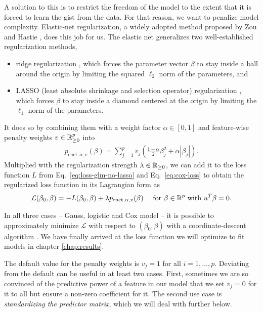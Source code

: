 A solution to this is to restrict the freedom of the model to the extent that it is forced to 
learn the gist from the data. For that reason, we want to penalize model complexity. Elastic-net 
regularization, a widely adopted method proposed by Zou and Hastie \cite{elasticnet05}, does this 
job for us. The elastic net generalizes two well-established regularization methods,
\begin{itemize}
    \item ridge regularization \cite{ridge70}, which forces the parameter vector $\beta$ to 
        stay inside a ball around the origin by limiting the squared $\ell_2$ norm 
        of the parameters, and 
    \item LASSO (least absolute shrinkage and selection operator) regularization \cite{lasso18}, 
        which forces $\beta$ to stay inside a diamond centered at the origin by limiting the 
        $\ell_1$ norm of the parameters.
\end{itemize}
It does so by combining them with a weight factor $\alpha \in [0, 1]$ and feature-wise penalty 
weights $v \in \mathbb{R}_{\geq 0}^p$ into
\begin{align}\label{eq:enet-weights}
    p_{\text{enet}, \alpha, v}(\beta) = \sum_{j=1}^p v_j \left( \frac{1-\alpha}{2} \beta_j^2 +
    \alpha |\beta_j| \right).
\end{align}
Multiplied with the regularization strength $\lambda \in \mathbb{R}_{\geq 0}$, we can add it to the loss 
function $L$ from Eq.\ \eqref{eq:loss-glm-no-lasso} and Eq.\ \eqref{eq:cox-loss} to obtain the 
regularized loss function in its Lagrangian form as 
\begin{align}\label{eq:loss-elastic-net}
    \mathcal{L}(\beta_0, \beta) = -L(\beta_0, \beta) + \lambda p_{\text{enet}, \alpha, v}(\beta) 
    \quad \text{ for } \beta \in \mathbb{R}^p \text{ with } u^T \beta = 0.
\end{align}

In all three cases -- Gauss, logistic and Cox model -- it is possible to approximately minimize 
$\mathcal{L}$ with respect to $(\beta_0, \beta)$ with a coordinate-descent algorithm 
\cite[section 2.3]{zerosum16}. We have finally arrived at the loss function we will optimize to 
fit models in chapter \ref{chap:results}.

The default value for the penalty weights is $v_j = 1$ for all $i = 1, \ldots, p$. Deviating from 
the default can be useful 
in at least two cases. First, sometimes we are so convinced of the predictive 
power of a feature in our model that we set $v_j = 0$ for it to all but ensure a non-zero 
coefficient for it. The second use case is \textit{standardizing the predictor matrix}, which 
we will deal with further below.


